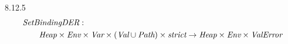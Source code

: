 \documentclass[a4paper]{article}
\newcommand{\If}{\mbox{if}}
\begin{document}
8.12.5
\begin{equation*}
\begin{split}
& \emph{SetBindingDER} : \\
&\qquad \emph{Heap} \times \emph{Env} \times \emph{Var} \times (\emph{Val} \cup \emph{Path}) \times \emph{strict} \rightarrow \emph{Heap} \times \emph{Env} \times \emph{ValError} \\
\end{split}
\end{equation*}
\end{document}
